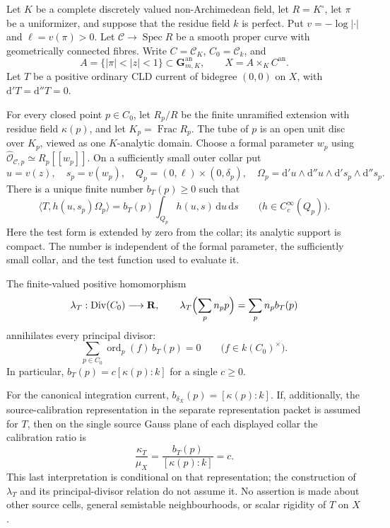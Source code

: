 \begin{proposition}
\label{prop:p213-product-residual-functional}
Let \(K\) be a complete discretely valued non-Archimedean field,
let \(R=K^\circ\), let \(\pi\) be a uniformizer, and suppose that
the residue field \(k\) is perfect. Put
\(v=-\log|\cdot|\) and \(\ell=v(\pi)>0\).
Let \(\mathcal C\to\operatorname{Spec}R\) be a smooth proper curve
with geometrically connected fibres. Write \(C=\mathcal C_K\),
\(C_0=\mathcal C_k\), and
\[
 A=\{|\pi|<|z|<1\}\subset\mathbf G_{m,K}^{\mathrm{an}},
 \qquad X=A\times_K C^{\mathrm{an}}.
\]
Let \(T\) be a positive ordinary CLD current of bidegree \((0,0)\)
on \(X\), with \(\mathrm d'T=\mathrm d''T=0\).

For every closed point \(p\in C_0\), let \(R_p/R\) be the finite
unramified extension with residue field \(\kappa(p)\), and let
\(K_p=\operatorname{Frac}R_p\). The tube of \(p\) is an open unit
disc over \(K_p\), viewed as one \(K\)-analytic domain. Choose a
formal parameter \(w_p\) using
\(\widehat{\mathcal O}_{\mathcal C,p}\simeq R_p[[w_p]]\).
On a sufficiently small outer collar put
\[
 u=v(z),\quad s_p=v(w_p),\quad
 Q_p=(0,\ell)\times(0,\delta_p),\quad
 \Omega_p=
 \mathrm d'u\wedge\mathrm d''u\wedge
 \mathrm d's_p\wedge\mathrm d''s_p.
\]
There is a unique finite number \(b_T(p)\geq0\) such that
\begin{equation}
\label{eq:p213-residual-branch-coefficient}
 \langle T,h(u,s_p)\Omega_p\rangle
   =b_T(p)\int_{Q_p}h(u,s)\,\mathrm du\,\mathrm ds
 \qquad\bigl(h\in C_c^\infty(Q_p)\bigr).
\end{equation}
Here the test form is extended by zero from the collar; its
analytic support is compact. The number is independent of the
formal parameter, the sufficiently small collar, and the
test function used to evaluate it.

The finite-valued positive homomorphism
\[
 \lambda_T:\operatorname{Div}(C_0)\longrightarrow\mathbf R,
 \qquad
 \lambda_T\Bigl(\sum_p n_p p\Bigr)=\sum_p n_pb_T(p)
\]
annihilates every principal divisor:
\begin{equation}
\label{eq:p213-residual-principal-relation}
 \sum_{p\in C_0}
   \operatorname{ord}_p(f)\,b_T(p)=0
 \qquad\bigl(f\in k(C_0)^\times\bigr).
\end{equation}
In particular, \(b_T(p)=c[\kappa(p):k]\) for a single \(c\geq0\).

For the canonical integration current,
\(b_{\delta_X}(p)=[\kappa(p):k]\).
If, additionally, the source-calibration representation in the
separate representation packet is assumed for \(T\), then on
the single source Gauss plane of each displayed collar the
calibration ratio is
\[
 \frac{\kappa_T}{\mu_X}
   =\frac{b_T(p)}{[\kappa(p):k]}=c .
\]
This last interpretation is conditional on that representation;
the construction of \(\lambda_T\) and its principal-divisor
relation do not assume it. No assertion is made about other
source cells, general semistable neighbourhoods, or scalar
rigidity of \(T\) on \(X\).
\end{proposition}

